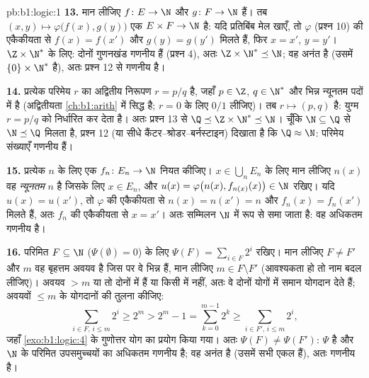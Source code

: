 \begin{solution}{pb:b1:logic:1}
\textbf{13.} मान लीजिए $f \colon E \to \N$ और $g \colon F \to \N$ 
 हैं। तब $(x, y) \mapsto \varphi\bigl(f(x), g(y)\bigr)$ एक 
 $E \times F \to \N$ है: यदि प्रतिबिंब मेल खाएँ, तो $\varphi$
(प्रश्न 10) की एकैकीयता से $f(x) = f(x')$ और $g(y) = g(y')$ मिलते हैं, फिर
$x = x'$, $y = y'$। $\Z \times \N^*$ के लिए: दोनों गुणनखंड गणनीय हैं (प्रश्न
4), अतः $\Z \times \N^* \preceq \N$; वह अनंत है (उसमें $\{0\} \times \N^*$
है), अतः प्रश्न 12 से गणनीय है।

\textbf{14.} प्रत्येक परिमेय $r$ का अद्वितीय निरूपण $r = p/q$ है, जहाँ $p
\in \Z$, $q \in \N^*$ और भिन्न न्यूनतम पदों में है (अद्वितीयता
\cref{ch:b1:arith} में सिद्ध है; $r = 0$ के लिए $0/1$ लीजिए)। तब 
$r \mapsto (p, q)$  है: युग्म $r = p/q$ को निर्धारित कर देता है। अतः
प्रश्न 13 से $\Q \preceq \Z \times \N^* \preceq \N$। चूँकि $\N \subseteq \Q$
से $\N \preceq \Q$ मिलता है, प्रश्न 12 (या सीधे कैंटर--श्रोडर--बर्नस्टाइन)
दिखाता है कि $\Q \approx \N$: परिमेय संख्याएँ गणनीय हैं।

\textbf{15.} प्रत्येक $n$ के लिए एक   $f_n \colon E_n \to
\N$ नियत कीजिए। $x \in \bigcup_n E_n$ के लिए मान लीजिए $n(x)$ वह
\emph{न्यूनतम} $n$ है जिसके लिए $x \in E_n$, और $u(x) = \varphi\bigl(n(x),
f_{n(x)}(x)\bigr) \in \N$ रखिए। यदि $u(x) = u(x')$, तो $\varphi$ की एकैकीयता
से $n(x) = n(x') = n$ और $f_n(x) = f_n(x')$ मिलते हैं, अतः $f_n$ की एकैकीयता
से $x = x'$। अतः सम्मिलन $\N$ में  रूप से समा जाता है: वह अधिकतम गणनीय
है।

\textbf{16.} परिमित $F \subseteq \N$ ($\Psi(\emptyset) = 0$) के लिए $\Psi(F)
= \sum_{i \in F} 2^i$ रखिए। मान लीजिए $F \neq F'$ और $m$ वह बृहत्तम अवयव है
जिस पर वे भिन्न हैं, मान लीजिए $m \in F \setminus F'$ (आवश्यकता हो तो नाम
बदल लीजिए)। अवयव $> m$ या तो दोनों में हैं या किसी में नहीं, अतः वे दोनों
योगों में समान योगदान देते हैं; अवयवों $\leq m$ के योगदानों की तुलना कीजिए:
\[
\sum_{i \in F,\, i \leq m} 2^i \geq 2^m
> 2^m - 1 = \sum_{k=0}^{m-1} 2^k
\geq \sum_{i \in F',\, i \leq m} 2^i ,
\]
जहाँ \cref{exo:b1:logic:4} के गुणोत्तर योग का प्रयोग किया गया। अतः $\Psi(F)
\neq \Psi(F')$: $\Psi$  है और $\N$ के परिमित उपसमुच्चयों का 
अधिकतम गणनीय है; वह अनंत है (उसमें सभी एकल  हैं), अतः गणनीय है।


\end{solution}
